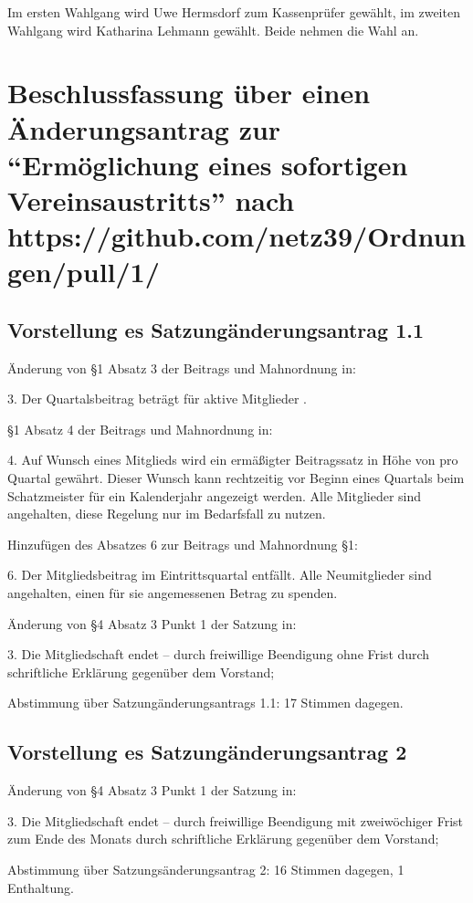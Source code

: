 \documentclass[a4paper,12pt,titlepage]{scrartcl}
\begin{document}
Im ersten Wahlgang wird Uwe Hermsdorf zum Kassenprüfer gewählt, im zweiten Wahlgang wird Katharina Lehmann gewählt.
Beide nehmen die Wahl an.

\section{Beschlussfassung über einen Änderungsantrag zur \enquote{Ermöglichung eines sofortigen Vereinsaustritts} nach https://github.com/netz39/Ordnungen/pull/1/}
\subsection{Vorstellung es Satzungänderungsantrag 1.1}

Änderung von §1 Absatz 3 der Beitrags und Mahnordnung in:
\begin{displayquote}
3. Der Quartalsbeitrag beträgt für aktive Mitglieder .
\end{displayquote}
§1 Absatz 4 der Beitrags und Mahnordnung in:
\begin{displayquote}
4. Auf Wunsch eines Mitglieds wird ein ermäßigter Beitragssatz in Höhe von  pro Quartal gewährt. Dieser Wunsch kann rechtzeitig vor Beginn eines Quartals beim Schatzmeister für ein Kalenderjahr angezeigt werden. Alle Mitglieder sind angehalten, diese Regelung nur im Bedarfsfall zu nutzen.
\end{displayquote}
Hinzufügen des Absatzes 6 zur Beitrags und Mahnordnung §1:
\begin{displayquote}
6. Der Mitgliedsbeitrag im Eintrittsquartal entfällt. Alle Neumitglieder sind angehalten, einen für sie angemessenen Betrag zu spenden.
\end{displayquote}
Änderung von §4 Absatz 3 Punkt 1 der Satzung in:
\begin{displayquote}
3. Die Mitgliedschaft endet – durch freiwillige Beendigung ohne Frist durch schriftliche Erklärung gegenüber dem Vorstand;
\end{displayquote}

Abstimmung über Satzungänderungsantrags 1.1: 17 Stimmen dagegen.

\subsection{Vorstellung es Satzungänderungsantrag 2}

Änderung von §4 Absatz 3 Punkt 1 der Satzung in:
\begin{displayquote}
3. Die Mitgliedschaft endet – durch freiwillige Beendigung mit zweiwöchiger Frist zum Ende des Monats durch schriftliche Erklärung gegenüber dem Vorstand;
\end{displayquote}
Abstimmung über Satzungsänderungsantrag 2: 16 Stimmen dagegen, 1 Enthaltung.
\end{document}
